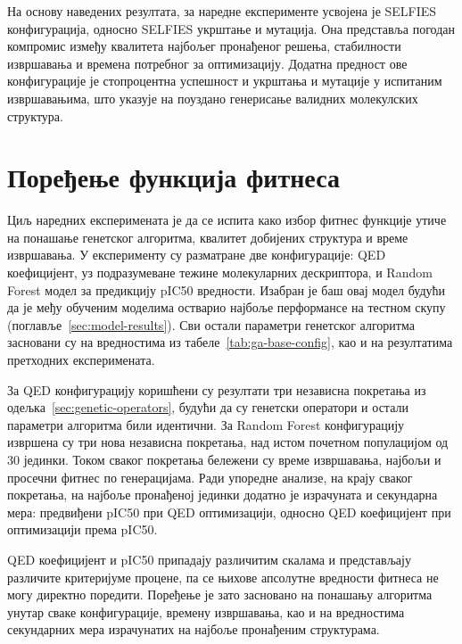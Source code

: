 \documentclass[12pt,oneside]{memoir}
\begin{document}
На основу наведених резултата, за наредне експерименте 
усвојена је SELFIES конфигурација, односно SELFIES укрштање 
и мутација. Она представља погодан компромис између 
квалитета најбољег пронађеног решења, стабилности 
извршавања и времена потребног за оптимизацију. Додатна 
предност ове конфигурације је стопроцентна успешност 
и укрштања и мутације у испитаним извршавањима, што 
указује на поуздано генерисање валидних молекулских 
структура.

\section{Поређење функција фитнеса}
\label{sec:fitness-functions}

Циљ наредних експеримената је да се испита како избор фитнес функције утиче
на понашање генетског алгоритма, квалитет добијених структура и
време извршавања. У експерименту су разматране две конфигурације:
QED коефицијент, уз подразумеване тежине молекуларних дескриптора, и Random Forest
модел за предикцију pIC50 вредности. Изабран је баш овај модел будући 
да је међу обученим моделима остварио најбоље перформансе
на тестном скупу (поглавље~\ref{sec:model-results}). Сви остали 
параметри генетског алгоритма засновани су на вредностима из табеле~\ref{tab:ga-base-config}, 
као и на резултатима претходних експеримената.

За QED конфигурацију коришћени су резултати три независна
покретања из одељка~\ref{sec:genetic-operators}, будући да су
генетски оператори и остали параметри алгоритма били идентични.
За Random Forest конфигурацију извршена су три нова независна
покретања, над истом почетном популацијом од 30 јединки. Током сваког покретања бележени су време извршавања,
најбољи и просечни фитнес по генерацијама. Ради упоредне анализе, 
на крају сваког покретања, на најбоље пронађеној јединки додатно је 
израчуната и секундарна мера: предвиђени pIC50 при QED оптимизацији, 
односно QED коефицијент при оптимизацији према pIC50.

QED коефицијент и pIC50 припадају различитим скалама и представљају
различите критеријуме процене, па се њихове апсолутне вредности
фитнеса не могу директно поредити. Поређење је зато засновано на
понашању алгоритма унутар сваке конфигурације, времену извршавања,
као и на вредностима секундарних мера израчунатих на најбоље
пронађеним структурама.
\end{document}
